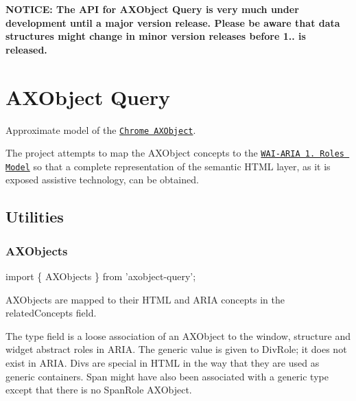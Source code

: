 \href{https://travis-ci.org/A11yance/axobject-query}{\tt }

{\bfseries N\+O\+T\+I\+CE\+: The A\+PI for A\+X\+Object Query is very much under development until a major version release. Please be aware that data structures might change in minor version releases before 1.. is released.}

\section*{A\+X\+Object Query}

Approximate model of the \href{https://cs.chromium.org/chromium/src/third_party/WebKit/Source/modules/accessibility/AXObject.h}{\tt Chrome A\+X\+Object}.

The project attempts to map the A\+X\+Object concepts to the \href{https://www.w3.org/TR/wai-aria-1.1/#roles}{\tt W\+A\+I-\/\+A\+R\+IA 1. Roles Model} so that a complete representation of the semantic H\+T\+ML layer, as it is exposed assistive technology, can be obtained.

\subsection*{Utilities}

\subsubsection*{A\+X\+Objects}


\begin{DoxyCode}
import \{ AXObjects \} from 'axobject-query';
\end{DoxyCode}


A\+X\+Objects are mapped to their H\+T\+ML and A\+R\+IA concepts in the {\ttfamily related\+Concepts} field.

The {\ttfamily type} field is a loose association of an A\+X\+Object to the {\ttfamily window}, {\ttfamily structure} and {\ttfamily widget} abstract roles in A\+R\+IA. The {\ttfamily generic} value is given to {\ttfamily Div\+Role}; it does not exist in A\+R\+IA. Divs are special in H\+T\+ML in the way that they are used as generic containers. Span might have also been associated with a generic type except that there is no {\ttfamily Span\+Role} A\+X\+Object.


